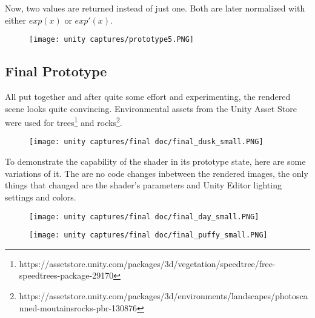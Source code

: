 \noindent
Now, two values are returned instead of just one. Both are later normalized with either $exp(x)$ or $exp'(x)$.

\begin{figure}[H]
    \centering
    \texttt{[image: unity captures/prototype5.PNG]}
    \label{img:captures:prototype5}
\end{figure}

\clearpage
\subsection{Final Prototype}
All put together and after quite some effort and experimenting, the rendered scene looks quite convincing. 
Environmental assets from the Unity Asset Store were used for trees\footnote[1]{https://assetstore.unity.com/packages/3d/vegetation/speedtree/free-speedtrees-package-29170} and rocks\footnote[2]{https://assetstore.unity.com/packages/3d/environments/landscapes/photoscanned-moutainsrocks-pbr-130876}.

\begin{figure}[H]
    \centering
    \texttt{[image: unity captures/final doc/final\_dusk\_small.PNG]}
    \label{img:captures:prototype_final:afternoon}
\end{figure}

\clearpage
\noindent
To demonstrate the capability of the shader in its prototype state, here are some variations of it. The are no code changes inbetween the rendered images, the only things that changed are the shader's \gls{parameters} and Unity Editor lighting settings and colors.

\begin{figure}[H]
    \centering
        \begin{minipage}{0.47\linewidth}
            \texttt{[image: unity captures/final doc/final\_day\_small.PNG]}
            \label{img:captures:prototype_final:day}
        \end{minipage}
    \hfill
        \begin{minipage}{0.47\linewidth}
            \texttt{[image: unity captures/final doc/final\_puffy\_small.PNG]}
            \label{img:captures:prototype_final:puffy}
        \end{minipage}
\end{figure}

